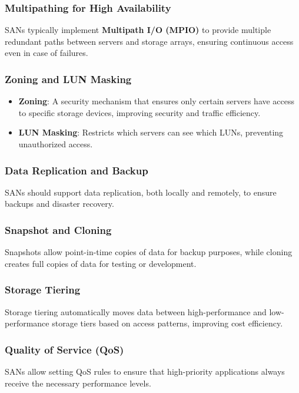 \documentclass{article}
\begin{document}
\subsubsection{Multipathing for High Availability}
SANs typically implement \textbf{Multipath I/O (MPIO)} to provide multiple redundant paths between servers and storage arrays, ensuring continuous access even in case of failures.

\subsubsection{Zoning and LUN Masking}
\begin{itemize}
    \item \textbf{Zoning}: A security mechanism that ensures only certain servers have access to specific storage devices, improving security and traffic efficiency.
    \item \textbf{LUN Masking}: Restricts which servers can see which LUNs, preventing unauthorized access.
\end{itemize}

\subsubsection{Data Replication and Backup}
SANs should support data replication, both locally and remotely, to ensure backups and disaster recovery.

\subsubsection{Snapshot and Cloning}
Snapshots allow point-in-time copies of data for backup purposes, while cloning creates full copies of data for testing or development.

\subsubsection{Storage Tiering}
Storage tiering automatically moves data between high-performance and low-performance storage tiers based on access patterns, improving cost efficiency.

\subsubsection{Quality of Service (QoS)}
SANs allow setting QoS rules to ensure that high-priority applications always receive the necessary performance levels.
\end{document}
